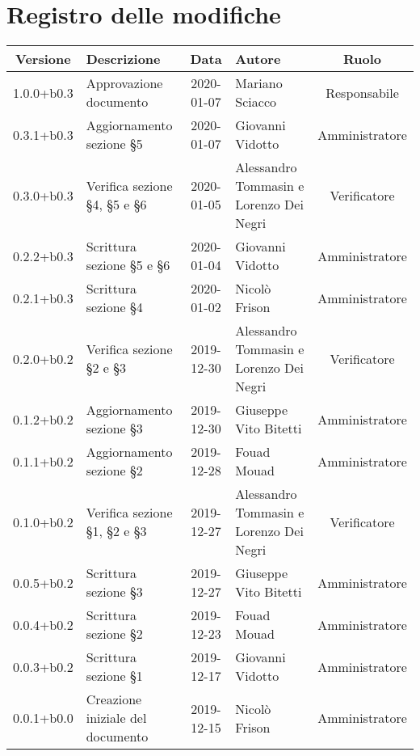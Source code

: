 \section*{Registro delle modifiche}

\begin{center}
	\begin{longtable}{|c|p{3cm}|c|p{4cm}|c|}
	\hline
	\rowcolor{lighter-grayer}
	\textbf{Versione} & \textbf{Descrizione} & \textbf{Data} & \textbf{Autore} & \textbf{Ruolo} \\
	\hline
	\endfirsthead

	1.0.0+b0.3 & Approvazione documento & 2020-01-07 & Mariano Sciacco & Responsabile \\
	\hline
	0.3.1+b0.3 & Aggiornamento sezione \S5 & 2020-01-07 & Giovanni Vidotto & Amministratore \\
	\hline
	0.3.0+b0.3 & Verifica sezione \S4, \S5 e \S6 & 2020-01-05 & Alessandro Tommasin e Lorenzo Dei Negri & Verificatore \\
	\hline
	0.2.2+b0.3 & Scrittura sezione \S5 e \S6 & 2020-01-04 & Giovanni Vidotto & Amministratore \\
	\hline
	0.2.1+b0.3 &  Scrittura sezione \S4 & 2020-01-02 & Nicolò Frison & Amministratore \\
	\hline
	0.2.0+b0.2 & Verifica sezione \S2 e \S3 & 2019-12-30 & Alessandro Tommasin e Lorenzo Dei Negri & Verificatore \\
	\hline
	0.1.2+b0.2 & Aggiornamento sezione \S3  & 2019-12-30 & Giuseppe Vito Bitetti & Amministratore \\
	\hline
	0.1.1+b0.2 & Aggiornamento sezione \S2  & 2019-12-28 & Fouad Mouad & Amministratore \\
	\hline
	0.1.0+b0.2 & Verifica sezione \S1, \S2 e \S3 & 2019-12-27 & Alessandro Tommasin e Lorenzo Dei Negri & Verificatore \\
	\hline
	0.0.5+b0.2 & Scrittura sezione \S3 & 2019-12-27  & Giuseppe Vito Bitetti & Amministratore \\
	\hline
	0.0.4+b0.2 & Scrittura sezione \S2 & 2019-12-23 & Fouad Mouad & Amministratore \\
	\hline
	0.0.3+b0.2 & Scrittura sezione \S1 & 2019-12-17 & Giovanni Vidotto & Amministratore \\
	\hline
	0.0.1+b0.0 & Creazione iniziale del documento & 2019-12-15 & Nicolò Frison & Amministratore \\
	\hline

	\end{longtable}
\end{center}